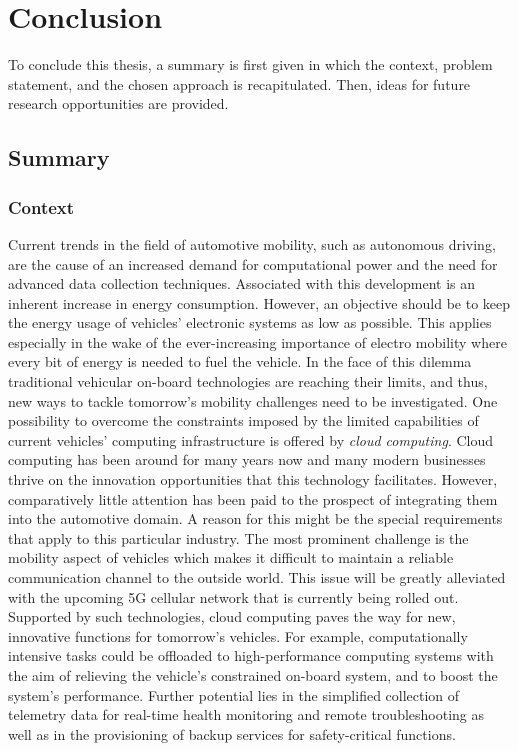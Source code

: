 \chapter{Conclusion}\label{chapter:conclusion}
To conclude this thesis, a summary is first given in which the context, problem statement, and the chosen approach is recapitulated. Then, ideas for future research opportunities are provided.

\section{Summary}\label{sec:summary}
\subsection{Context}
Current trends in the field of automotive mobility, such as autonomous driving, are the cause of an increased demand for computational power and the need for advanced data collection techniques. Associated with this development is an inherent increase in energy consumption. However, an objective should be to keep the energy usage of vehicles' electronic systems as low as possible. This applies especially in the wake of the ever-increasing importance of electro mobility where every bit of energy is needed to fuel the vehicle. In the face of this dilemma traditional vehicular on-board technologies are reaching their limits, and thus, new ways to tackle tomorrow's mobility challenges need to be investigated. One possibility to overcome the constraints imposed by the limited capabilities of current vehicles' computing infrastructure is offered by \emph{cloud computing}. Cloud computing has been around for many years now and many modern businesses thrive on the innovation opportunities that this technology facilitates. However, comparatively little attention has been paid to the prospect of integrating them into the automotive domain. A reason for this might be the special requirements that apply to this particular industry. The most prominent challenge is the mobility aspect of vehicles which makes it difficult to maintain a reliable communication channel to the outside world. This issue will be greatly alleviated with the upcoming 5G cellular network that is currently being rolled out. Supported by such technologies, cloud computing paves the way for new, innovative functions for tomorrow's vehicles. For example, computationally intensive tasks could be offloaded to high-performance computing systems with the aim of relieving the vehicle's constrained on-board system, and to boost the system's performance. Further potential lies in the simplified collection of telemetry data for real-time health monitoring and remote troubleshooting as well as in the provisioning of backup services for safety-critical functions.


